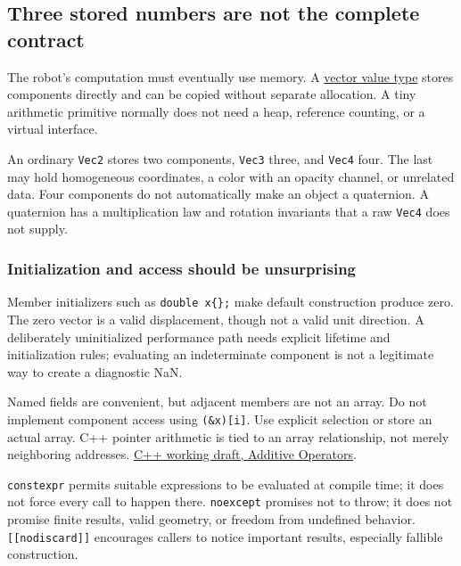 \subsection{Three stored numbers are not the complete contract}\label{02-foundations-ii-ch037-three-stored-numbers-are-not-the-complete-contract}

The robot's computation must eventually use memory. A \hyperref[02-foundations-ii-ch037-three-stored-numbers-are-not-the-complete-contract]{vector value type} stores components directly and can be copied without separate allocation. A tiny arithmetic primitive normally does not need a heap, reference counting, or a virtual interface.

An ordinary \texttt{Vec2} stores two components, \texttt{Vec3} three, and \texttt{Vec4} four. The last may hold homogeneous coordinates, a color with an opacity channel, or unrelated data. Four components do not automatically make an object a quaternion. A quaternion has a multiplication law and rotation invariants that a raw \texttt{Vec4} does not supply.

\subsubsection{Initialization and access should be unsurprising}\label{02-foundations-ii-ch037-initialization-and-access-should-be-unsurprising}

Member initializers such as \texttt{double\ x\{\};} make default construction produce zero. The zero vector is a valid displacement, though not a valid unit direction. A deliberately uninitialized performance path needs explicit lifetime and initialization rules; evaluating an indeterminate component is not a legitimate way to create a diagnostic NaN.

Named fields are convenient, but adjacent members are not an array. Do not implement component access using \texttt{(\&x){[}i{]}}. Use explicit selection or store an actual array. C++ pointer arithmetic is tied to an array relationship, not merely neighboring addresses. \href{https://eel.is/c++draft/expr.add}{C++ working draft, Additive Operators}.

\texttt{constexpr} permits suitable expressions to be evaluated at compile time; it does not force every call to happen there. \texttt{noexcept} promises not to throw; it does not promise finite results, valid geometry, or freedom from undefined behavior. \texttt{{[}{[}nodiscard{]}{]}} encourages callers to notice important results, especially fallible construction.


